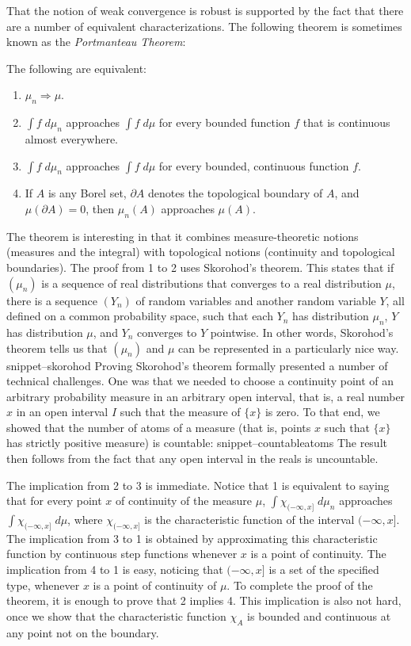 \documentclass{svjour3}
\newcommand{\Snippet}[1]{\csname snippet--#1\endcsname}
\begin{document}
That the notion of weak convergence is robust is supported by the fact that there are a number of equivalent characterizations. The following theorem is sometimes known as the \emph{Portmanteau Theorem}:
\begin{theorem}
The following are equivalent:
\begin{enumerate}
 \item $\mu_n \Rightarrow \mu$.
 \item $\int f \; d\mu_n$ approaches $\int f \; d\mu$ for every bounded function $f$ that is continuous almost everywhere.
 \item $\int f \; d\mu_n$ approaches $\int f \; d\mu$ for every bounded, continuous function $f$.
 \item If $A$ is any Borel set, $\partial A$ denotes the topological boundary of $A$, and $\mu(\partial A) = 0$, then $\mu_n(A)$ approaches $\mu(A)$. 
\end{enumerate}
\end{theorem}
The theorem is interesting in that it combines measure-theoretic notions (measures and the integral) with topological notions (continuity and topological boundaries). The proof from 1 to 2 uses Skorohod's theorem. This states that if $(\mu_n)$ is a sequence of real distributions that converges to a real distribution $\mu$, there is a sequence $(Y_n)$ of random variables and another random variable $Y$, all defined on a common probability space, such that each $Y_n$ has distribution $\mu_n$, $Y$ has distribution $\mu$, and $Y_n$ converges to $Y$ pointwise. In other words, Skorohod's theorem tells us that $(\mu_n)$ and $\mu$ can be represented in a particularly nice way. 
\Snippet{skorohod}
Proving Skorohod's theorem formally presented a number of technical challenges. One was that we needed to choose a continuity point of an arbitrary probability measure in an arbitrary open interval, that is, a real number $x$ in an open interval $I$ such that the measure of $\{x\}$ is zero. To that end, we showed that the number of atoms of a measure (that is, points $x$ such that $\{x\}$ has strictly positive measure) is countable:
\Snippet{countableatoms}
The result then follows from the fact that any open interval in the reals is uncountable. 

The implication from 2 to 3 is immediate. Notice that 1 is equivalent to saying that for every point $x$ of continuity of the measure $\mu$, $\int \chi_{(-\infty,x]} \; d\mu_n$ approaches $\int \chi_{(-\infty,x]} \; d\mu$, where $\chi_{(-\infty,x]}$ is the characteristic function of the interval $(-\infty,x]$. The implication from 3 to 1 is obtained by approximating this characteristic function by continuous step functions whenever $x$ is a point of continuity. The implication from 4 to 1 is easy, noticing that $(-\infty,x]$ is a set of the specified type, whenever $x$ is a point of continuity of $\mu$. To complete the proof of the theorem, it is enough to prove that 2 implies 4. This implication is also not hard, once we show that the characteristic function $\chi_A$ is bounded and continuous at any point not on the boundary.
\end{document}
